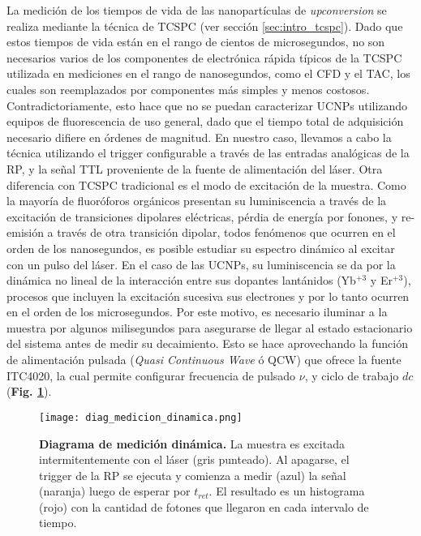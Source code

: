 La medición de los tiempos de vida de las nanopartículas de \textit{upconversion} se realiza mediante la técnica de TCSPC (ver sección \ref{sec:intro_tcspc}).
Dado que estos tiempos de vida están en el rango de cientos de microsegundos, no son necesarios varios de los componentes de electrónica rápida típicos de la TCSPC utilizada en mediciones en el rango de nanosegundos, como el CFD y el TAC, los cuales son reemplazados por componentes más simples y menos costosos.
Contradictoriamente, esto hace que no se puedan caracterizar UCNPs utilizando equipos de fluorescencia de uso general, dado que el tiempo total de adquisición necesario difiere en órdenes de magnitud.
En nuestro caso, llevamos a cabo la técnica utilizando el trigger configurable a través de las entradas analógicas de la RP, y la señal TTL proveniente de la fuente de alimentación del láser.
Otra diferencia con TCSPC tradicional es el modo de excitación de la muestra.
Como la mayoría de fluoróforos orgánicos presentan su luminiscencia a través de la excitación de transiciones dipolares eléctricas, pérdia de energía por fonones, y re-emisión a través de otra transición dipolar, todos fenómenos que ocurren en el orden de los nanosegundos, es posible estudiar su espectro dinámico al excitar con un pulso del láser.
En el caso de las UCNPs, su luminiscencia se da por la dinámica no lineal de la interacción entre sus dopantes lantánidos (Yb$^{+3}$ y Er$^{+3}$), procesos que incluyen la excitación sucesiva sus electrones y por lo tanto ocurren en el orden de los microsegundos.
Por este motivo, es necesario iluminar a la muestra por algunos milisegundos para asegurarse de llegar al estado estacionario del sistema antes de medir su decaimiento.
Esto se hace aprovechando la función de alimentación pulsada (\textit{Quasi Continuous Wave} ó QCW) que ofrece la fuente ITC4020, la cual permite configurar frecuencia de pulsado $\nu$, y ciclo de trabajo $dc$ (\textbf{Fig. \ref{fig:diag_medicion_dinamica}}).

\begin{figure}
     \centering
     \texttt{[image: diag\_medicion\_dinamica.png]}
     \caption{\textbf{Diagrama de medición dinámica.} La muestra es excitada intermitentemente con el láser (gris punteado). Al apagarse, el trigger de la RP se ejecuta y comienza a medir (azul) la señal (naranja) luego de esperar por $t_{ret}$. El resultado es un histograma (rojo) con la cantidad de fotones que llegaron en cada intervalo de tiempo.}
     \label{fig:diag_medicion_dinamica}
\end{figure}

